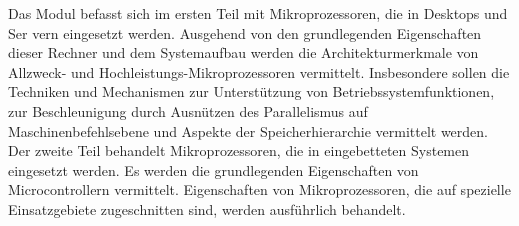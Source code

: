 \begin{module}
\begin{content}
Das Modul befasst sich im ersten Teil mit Mikroprozessoren, die in Desktops und Ser vern eingesetzt werden. Ausgehend von den grundlegenden Eigenschaften dieser Rechner und dem Systemaufbau werden die Architekturmerkmale von Allzweck- und Hochleistungs-Mikroprozessoren vermittelt. Insbesondere sollen die Techniken und Mechanismen zur Unterstützung von Betriebssystemfunktionen, zur Beschleunigung durch Ausnützen des Parallelismus auf Maschinenbefehlsebene und Aspekte der Speicherhierarchie vermittelt werden. \newline
Der zweite Teil behandelt Mikroprozessoren, die in eingebetteten Systemen eingesetzt werden. Es werden die grundlegenden Eigenschaften von Microcontrollern vermittelt. Eigenschaften von Mikroprozessoren, die auf spezielle Einsatzgebiete zugeschnitten sind, werden ausführlich behandelt.


\end{content}



\end{module}

